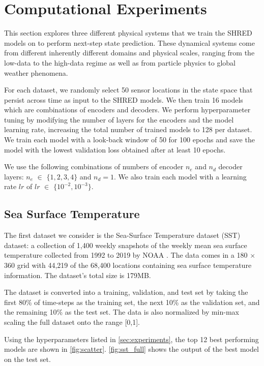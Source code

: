\documentclass[11pt, a4paper]{article}
\begin{document}
\section{Computational Experiments}
\label{sec:experiments}

This section explores three different physical systems that we train the SHRED models on to perform next-step state prediction. These dynamical systems come from different inherently different domains and physical scales, ranging from the low-data to the high-data regime as well as from particle physics to global weather phenomena.

For each dataset, we randomly select 50 sensor locations in the state space that persist across time as input to the SHRED models. We then train 16 models which are combinations of encoders and decoders. We perform hyperparameter tuning by modifying the number of layers for the encoders and the model learning rate, increasing the total number of trained models to 128 per dataset. We train each model with a look-back window of 50 for 100 epochs and save the model with the lowest validation loss obtained after at least 10 epochs.

We use the following combinations of numbers of encoder $n_e$ and $n_d$ decoder layers: $n_e$ $\in$ $\{1, 2, 3, 4\}$ and $n_d = 1$. We also train each model with a learning rate $lr$ of $lr$ $\in$ $\{10^{-2}, 10^{-3}\}$.

\subsection{Sea Surface Temperature}

The first dataset we consider is the Sea-Surface Temperature dataset (SST) dataset: a collection of 1,400 weekly snapshots of the weekly mean sea surface temperature collected from 1992 to 2019 by NOAA \cite{reynolds2002improved}. The data comes in a 180 $\times$ 360 grid with 44,219 of the 68,400 locations containing sea surface temperature information. The dataset's total size is 179MB.

The dataset is converted into a training, validation, and test set by taking the first 80\% of time-steps as the training set, the next 10\% as the validation set, and the remaining 10\% as the test set. The data is also normalized by min-max scaling the full dataset onto the range [0,1].

Using the hyperparameters listed in \autoref{sec:experiments}, the top 12 best performing models are shown in \autoref{fig:scatter}. \autoref{fig:sst_full} shows the output of the best model on the test set.
\end{document}
